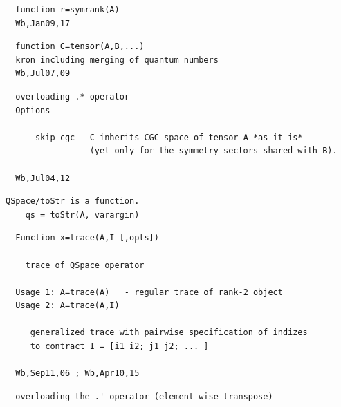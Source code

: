 \documentclass[twoside,12pt]{article}
\begin{document}
\pagebreak[3]



\begin{verbatim}
  function r=symrank(A)
  Wb,Jan09,17
\end{verbatim}

\pagebreak[3]



\begin{verbatim}
  function C=tensor(A,B,...)
  kron including merging of quantum numbers
  Wb,Jul07,09
\end{verbatim}

\pagebreak[3]



\begin{verbatim}
  overloading .* operator
  Options
 
    --skip-cgc   C inherits CGC space of tensor A *as it is*
                 (yet only for the symmetry sectors shared with B).
 
  Wb,Jul04,12
\end{verbatim}

\pagebreak[3]



\begin{verbatim}
QSpace/toStr is a function.
    qs = toStr(A, varargin)
\end{verbatim}

\pagebreak[3]



\begin{verbatim}
  Function x=trace(A,I [,opts])
 
    trace of QSpace operator
 
  Usage 1: A=trace(A)   - regular trace of rank-2 object
  Usage 2: A=trace(A,I)
 
     generalized trace with pairwise specification of indizes
     to contract I = [i1 i2; j1 j2; ... ]
 
  Wb,Sep11,06 ; Wb,Apr10,15
\end{verbatim}

\pagebreak[3]



\begin{verbatim}
  overloading the .' operator (element wise transpose)
\end{verbatim}
\end{document}
